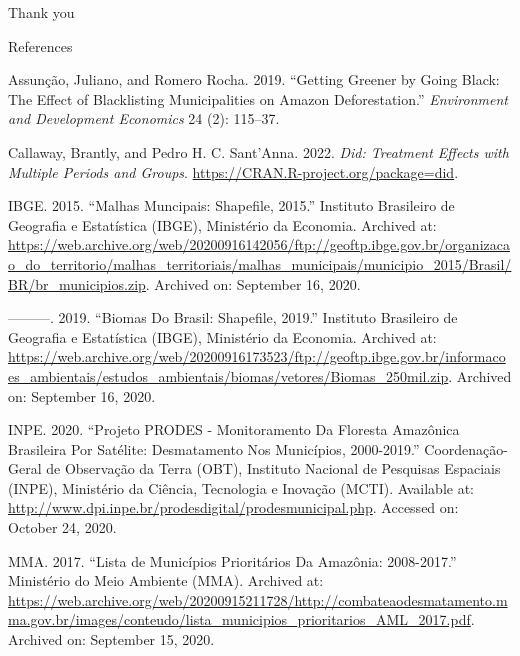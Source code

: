 \documentclass[
  ignorenonframetext,
  aspectratio=169]{beamer}
\newlength{\cslhangindent}
\newlength{\cslentryspacingunit} %
\newenvironment{CSLReferences}[2] %
 {%
  \setlength{\parindent}{0pt}
  \ifodd #1
  \let\oldpar\par
  \def\par{\hangindent=\cslhangindent\oldpar}
  \fi
  \setlength{\parskip}{#2\cslentryspacingunit}
 }%
 {}
\begin{document}
\begin{frame}[plain]
\begin{center}
\Large Thank you
\end{center}
\end{frame}

\appendix
\begin{frame}[allowframebreaks]{References}

\tiny

\hypertarget{refs}{}
\begin{CSLReferences}{1}{0}
\leavevmode{}%
Assunção, Juliano, and Romero Rocha. 2019. {``Getting Greener by Going
Black: The Effect of Blacklisting Municipalities on Amazon
Deforestation.''} \emph{Environment and Development Economics} 24 (2):
115--37.

\leavevmode{}%
Callaway, Brantly, and Pedro H. C. Sant'Anna. 2022. \emph{Did: Treatment
Effects with Multiple Periods and Groups}.
\url{https://CRAN.R-project.org/package=did}.

\leavevmode{}%
IBGE. 2015. {``Malhas Muncipais: Shapefile, 2015.''} Instituto
Brasileiro de Geografia e Estatística (IBGE), Ministério da Economia.
Archived at:
\url{https://web.archive.org/web/20200916142056/ftp://geoftp.ibge.gov.br/organizacao_do_territorio/malhas_territoriais/malhas_municipais/municipio_2015/Brasil/BR/br_municipios.zip}.
Archived on: September 16, 2020.

\leavevmode{}%
---------. 2019. {``Biomas Do Brasil: Shapefile, 2019.''} Instituto
Brasileiro de Geografia e Estatística (IBGE), Ministério da Economia.
Archived at:
\url{https://web.archive.org/web/20200916173523/ftp://geoftp.ibge.gov.br/informacoes_ambientais/estudos_ambientais/biomas/vetores/Biomas_250mil.zip}.
Archived on: September 16, 2020.

\leavevmode{}%
INPE. 2020. {``Projeto PRODES - Monitoramento Da Floresta Amazônica
Brasileira Por Satélite: Desmatamento Nos Municípios, 2000-2019.''}
Coordenação-Geral de Observação da Terra (OBT), Instituto Nacional de
Pesquisas Espaciais (INPE), Ministério da Ciência, Tecnologia e Inovação
(MCTI). Available at:
\url{http://www.dpi.inpe.br/prodesdigital/prodesmunicipal.php}. Accessed
on: October 24, 2020.

\leavevmode{}%
MMA. 2017. {``Lista de Municípios Prioritários Da Amazônia:
2008-2017.''} Ministério do Meio Ambiente (MMA). Archived at:
\url{https://web.archive.org/web/20200915211728/http://combateaodesmatamento.mma.gov.br/images/conteudo/lista_municipios_prioritarios_AML_2017.pdf}.
Archived on: September 15, 2020.

\end{CSLReferences}
\end{frame}
\end{document}
